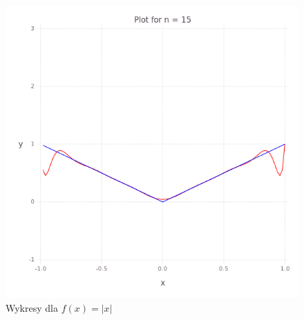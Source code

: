 \begin{figure}
\begin{multicols}{2}
    \end{multicols}
    \begin{multicols}{2}
        \includegraphics[width=\linewidth]{../task-6/plots/myplot-abs-15.png}\par 
    \end{multicols}
    \caption{Wykresy dla $f(x) = |x|$}    
\end{figure}
